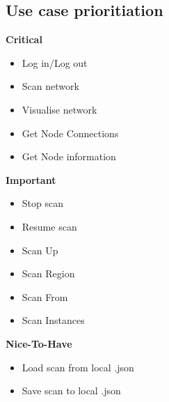\documentclass[a4paper,12pt]{report}
\begin{document}
\subsection{Use case prioritiation}
\textbf{Critical} 
\begin{itemize}
  \item Log in/Log out
  \item Scan network
  \item Visualise network
  \item Get Node Connections
  \item Get Node information
\end{itemize}
\textbf{Important} 
\begin{itemize}
  \item Stop scan
  \item Resume scan
  \item Scan Up
  \item Scan Region
  \item Scan From
  \item Scan Instances
\end{itemize}
\textbf{Nice-To-Have} 
\begin{itemize}
  \item Load scan from local .json
  \item Save scan to local .json
\end{itemize}
\newpage
\end{document}
